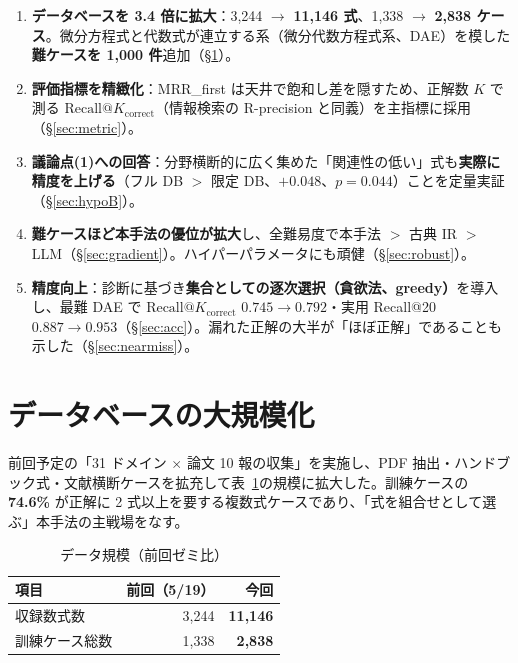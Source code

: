 \documentclass[11pt,a4paper]{ltjsarticle}
\makeatletter
\newcommand{\rkc}{\textrm{Recall@}K_{\textrm{correct}}}
\makeatother
\begin{document}
\begin{enumerate}[leftmargin=1.8em]
  \item \textbf{データベースを 3.4 倍に拡大}：3{,}244 $\to$ \textbf{11{,}146 式}、1{,}338 $\to$ \textbf{2{,}838 ケース}。微分方程式と代数式が連立する系（微分代数方程式系、DAE）を模した\textbf{難ケースを 1{,}000 件}追加（\S\ref{sec:data}）。
  \item \textbf{評価指標を精緻化}：MRR\_first は天井で飽和し差を隠すため、正解数 $K$ で測る $\rkc$（情報検索の R-precision と同義）を主指標に採用（\S\ref{sec:metric}）。
  \item \textbf{議論点(1)への回答}：分野横断的に広く集めた「関連性の低い」式も\textbf{実際に精度を上げる}（フル DB $>$ 限定 DB、$+0.048$、$p=0.044$）ことを定量実証（\S\ref{sec:hypoB}）。
  \item \textbf{難ケースほど本手法の優位が拡大}し、全難易度で本手法 $>$ 古典 IR $>$ LLM（\S\ref{sec:gradient}）。ハイパーパラメータにも頑健（\S\ref{sec:robust}）。
  \item \textbf{精度向上}：診断に基づき\textbf{集合としての逐次選択（貪欲法、greedy）}を導入し、最難 DAE で $\rkc$ $0.745\to0.792$・実用 Recall@20 $0.887\to0.953$（\S\ref{sec:acc}）。漏れた正解の大半が「ほぼ正解」であることも示した（\S\ref{sec:nearmiss}）。
\end{enumerate}

\section{データベースの大規模化}\label{sec:data}
前回予定の「31 ドメイン $\times$ 論文 10 報の収集」を実施し、PDF 抽出・ハンドブック式・文献横断ケースを拡充して表~\ref{tab:scale}の規模に拡大した。訓練ケースの \textbf{74.6\%} が正解に 2 式以上を要する複数式ケースであり、「式を組合せとして選ぶ」本手法の主戦場をなす。

\begin{table}[h]\centering
\caption{データ規模（前回ゼミ比）}\label{tab:scale}
\begin{tabular}{lrr}
\toprule
項目 & 前回（5/19）& \textbf{今回} \\
\midrule
収録数式数 & 3{,}244 & \textbf{11{,}146} \\
訓練ケース総数 & 1{,}338 & \textbf{2{,}838} \\
\bottomrule
\end{tabular}
\end{table}
\end{document}
